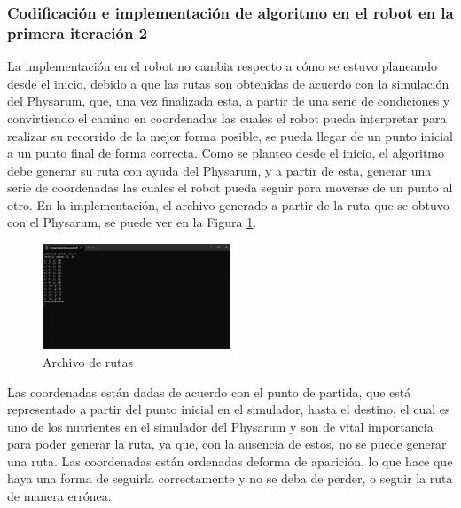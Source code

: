 \subsubsection{Codificaci\'on e implementaci\'on de algoritmo en el robot en la primera iteraci\'on 2}
    La implementaci\'on en el robot no cambia respecto a c\'omo se
        estuvo planeando desde el inicio, debido a que las rutas son
        obtenidas de acuerdo con la simulaci\'on del Physarum, que,
        una vez finalizada esta, a partir de una serie de condiciones y
        convirtiendo el camino en coordenadas las cuales el robot
        pueda interpretar para realizar su recorrido de la mejor forma
        posible, se pueda llegar de un punto inicial a un punto final
        de forma correcta.
        \vskip 0.5cm
    Como se planteo desde el inicio, el algoritmo debe generar
        su ruta con ayuda del Physarum, y a partir de esta, generar
        una serie de coordenadas las cuales el robot pueda seguir
        para moverse de un punto al otro. En la implementaci\'on, el
        archivo generado a partir de la ruta que se obtuvo con el
        Physarum, se puede ver en la Figura \ref{fig:Archivoderutas01}.
    \vskip 0.5cm
    \begin{figure}[htbp]
        \centering
        \includegraphics[width=0.5\textwidth]{./images/Pruebas/simulador/image043.png}
        \caption{Archivo de rutas}
        \label{fig:Archivoderutas01}
    \end{figure}
    \vskip 0.5cm
    Las coordenadas est\'an dadas de acuerdo con el punto de
        partida, que est\'a representado a partir del punto inicial en el
        simulador, hasta el destino, el cual es uno de los nutrientes
        en el simulador del Physarum y son de vital importancia para
        poder generar la ruta, ya que, con la ausencia de estos, no se
        puede generar una ruta. Las coordenadas est\'an ordenadas deforma de aparici\'on, lo que hace que haya una forma de
        seguirla correctamente y no se deba de perder, o seguir la
        ruta de manera err\'onea.